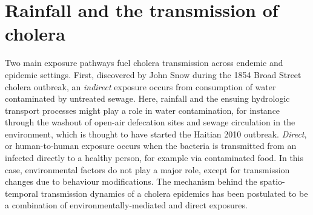 \section{Rainfall and the transmission of cholera} \label{sec:rainfall-cholera-transmission}
Two main exposure pathways fuel cholera transmission across endemic and epidemic settings.
First, discovered by John Snow during the 1854 Broad Street cholera outbreak, an \textit{indirect} exposure occurs from consumption of water contaminated by untreated sewage\cite{Snow:ModeCommunicationCholera:1855}. Here, rainfall and the ensuing hydrologic transport processes might play a role in water contamination, for instance through the washout of open-air defecation sites and sewage circulation in the environment, which is thought to have started the Haitian 2010 outbreak\cite{Piarroux:UnderstandingCholeraEpidemic:2011}.
\textit{Direct}, or human-to-human exposure occurs when the bacteria is transmitted from an infected directly to a healthy person, for example via contaminated food. In this case, environmental factors do not play a major role, except for transmission changes due to behaviour modifications.
The mechanism behind the spatio-temporal transmission dynamics of a cholera epidemics has been postulated to be a combination of environmentally-mediated and direct exposures\cite{Sugimoto:HouseholdTransmissionVibrio:2014,Bi:MicroscaleSpatialClustering:2016,Lessler:MeasuringSpatialDependence:2016,Rinaldo:ModelingKeyDrivers:2017}.
